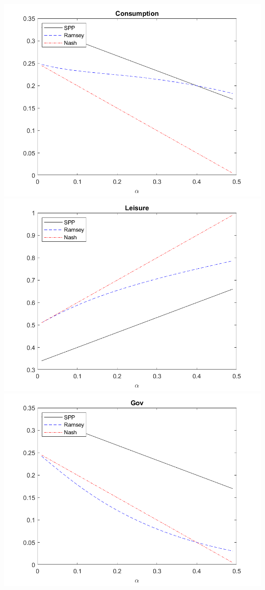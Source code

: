 \documentclass[11pt]{article} %
\begin{document}
\includegraphics{cons}
\includegraphics{leisure}
\includegraphics{gov}
\end{document}
